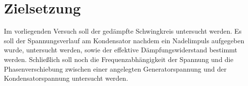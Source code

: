 \section{Zielsetzung}
\label{sec:Zielsetzung}
Im vorliegenden Versuch soll der gedämpfte Schwingkreis untersucht werden.
Es soll der Spannungsverlauf am Kondensator nachdem ein Nadelimpuls aufgegeben wurde, untersucht werden, sowie der effektive Dämpfungswiderstand bestimmt werden.
Schließlich soll noch die Frequenzabhängigkeit der Spannung und die Phasenverschiebung zwischen einer angelegten Generatorspannung und der Kondensatorspannung untersucht werden.  
